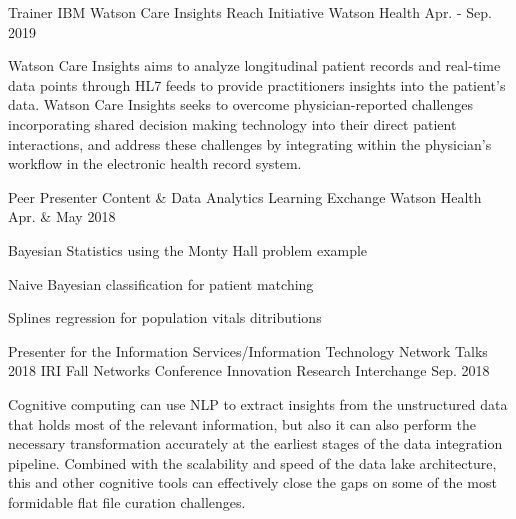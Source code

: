 

\begin{cventries}

  \cventry
    {Trainer} %
    {IBM Watson Care Insights Reach Initiative} %
    {Watson Health} %
    {Apr. - Sep. 2019} %
    {
      \begin{cvitems} %
        \item {Watson Care Insights aims to analyze longitudinal patient records and real-time data points through HL7 feeds to provide practitioners insights into the patient’s data.  Watson Care Insights seeks to overcome physician-reported challenges incorporating shared decision making technology into their direct patient interactions, and address these challenges by integrating within the physician's workflow in the electronic health record system.}
      \end{cvitems}
    }

  \cventry
    {Peer Presenter} %
    {Content \& Data Analytics Learning Exchange} %
    {Watson Health} %
    {Apr. \& May 2018} %
    {
      \begin{cvitems} %
        \item {Bayesian Statistics using the Monty Hall problem example}
        \item {Naive Bayesian classification for patient matching}
        \item {Splines regression for population vitals ditributions}
      \end{cvitems}
    }

  \cventry
    {Presenter for the Information Services/Information Technology Network Talks} %
    {2018 IRI Fall Networks Conference} %
    {Innovation Research Interchange} %
    {Sep. 2018} %
    {
      \begin{cvitems} %
        \item {Cognitive computing can use NLP to extract insights from the unstructured data that holds most of the relevant information, but also it can also perform the necessary transformation accurately at the earliest stages of the data integration pipeline.  Combined with the scalability and speed of the data lake architecture, this and other cognitive tools can effectively close the gaps on some of the most formidable flat file curation challenges.}
      \end{cvitems}
    }


\end{cventries}
